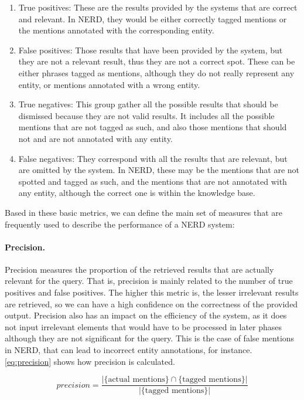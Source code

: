 \begin{enumerate}
	\item True positives: These are the results provided by the systems that are correct and relevant. In NERD, they would be either correctly tagged mentions or the mentions annotated with the corresponding entity.
	\item False positives: Those results that have been provided by the system, but they are not a relevant result, thus they are not a correct spot. These can be either phrases tagged as mentions, although they do not really represent any entity, or mentions annotated with a wrong entity.
	\item True negatives: This group gather all the possible results that should be dismissed because they are not valid results. It includes all the possible mentions that are not tagged as such, and also those mentions that should not and are not annotated with any entity.
	\item False negatives: They correspond with all the results that are relevant, but are omitted by the system. In NERD, these may be the mentions that are not spotted and tagged as such, and the mentions that are not annotated with any entity, although the correct one is within the knowledge base.
\end{enumerate}

Based in these basic metrics, we can define the main set of measures that are frequently used to describe the performance of a NERD system:

\paragraph{Precision.}

Precision measures the proportion of the retrieved results that are actually relevant for the query. That is, precision is mainly related to the number of true positives and false positives. The higher this metric is, the lesser irrelevant results are retrieved, so we can have a high confidence on the correctness of the provided output. Precision also has an impact on the efficiency of the system, as it does not input irrelevant elements that would have to be processed in later phases although they are not significant for the query. This is the case of false mentions in NERD, that can lead to incorrect entity annotations, for instance. \autoref{eq:precision} shows how precision is calculated.

\begin{equation}
precision = \frac{|\{\text{actual mentions}\} \cap \{\text{tagged mentions}\}|}{|\{\text{tagged mentions}\}|}
\label{eq:precision}
\end{equation}


